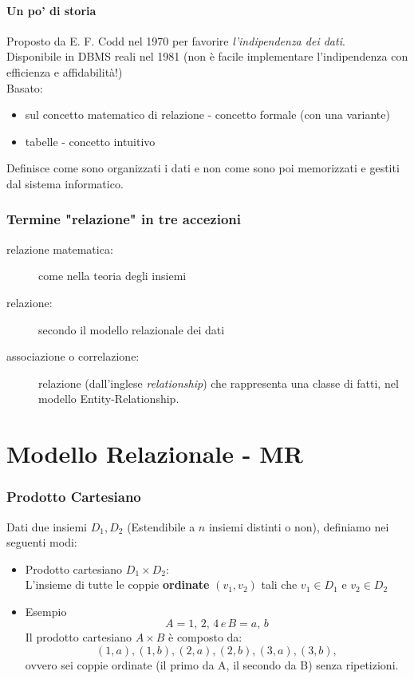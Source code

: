 \subsubsection{Un po' di storia}
Proposto da E. F. Codd nel 1970 per favorire \textit{l'indipendenza dei dati}.
\\Disponibile in DBMS reali nel 1981 (non è facile implementare l'indipendenza con efficienza e affidabilità!)
\\Basato:
\begin{itemize}
    \item sul concetto matematico di relazione - concetto formale (con una variante)
    \item tabelle - concetto intuitivo
\end{itemize}
Definisce come sono organizzati i dati e non come sono poi memorizzati e gestiti dal sistema informatico.

\subsection{Termine "relazione" in tre accezioni}
\begin{description}
    \item[relazione matematica:] come nella teoria degli insiemi
    \item[relazione:] secondo il modello relazionale dei dati
    \item[associazione o correlazione:] relazione (dall'inglese \textit{relationship}) che rappresenta una classe di fatti, nel modello Entity-Relationship.   
\end{description}

\chapter{Modello Relazionale - MR}
\subsection{Prodotto Cartesiano}
Dati due insiemi $D_1, D_2$ (Estendibile a $n$ insiemi distinti o non), definiamo nei seguenti modi:
\begin{itemize}
    \item Prodotto cartesiano $D_1 \times D_2$:
    \\L'insieme di tutte le coppie \textbf{ordinate} $(v_1, v_2)$ tali che $v_1 \in D_1$ e $v_2 \in D_2$
    \item Esempio $$A = {1,\, 2,\, 4}\, e\, B = {a,\, b}$$ Il prodotto cartesiano $A \times B$ è composto da: $${(1,a), (1,b), (2,a), (2,b), (3,a), (3,b)},$$ ovvero sei coppie ordinate (il primo da A, il secondo da B) senza ripetizioni.
\end{itemize}

